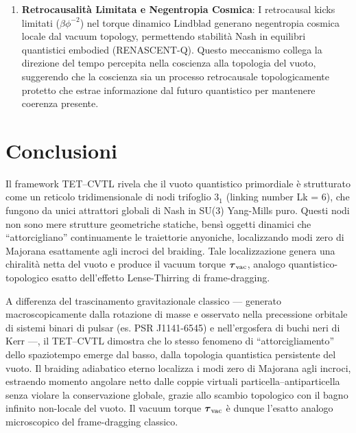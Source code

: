 \documentclass[11pt,a4paper]{article}
\theoremstyle{plain}
\theoremstyle{definition}
\begin{document}
\begin{tcolorbox}
\begin{tcolorbox}[colback=gray!10!white, colframe=blue!80!black, title=Assiomi Fondamentali TET--CVTL]
\begin{enumerate}
    \item \textbf{Retrocausalità Limitata e Negentropia Cosmica}:  
    I retrocausal kicks limitati ($\beta \phi^{-2}$) nel torque dinamico Lindblad generano negentropia cosmica locale dal vacuum topology, permettendo stabilità Nash in equilibri quantistici embodied (RENASCENT-Q). Questo meccanismo collega la direzione del tempo percepita nella coscienza alla topologia del vuoto, suggerendo che la coscienza sia un processo retrocausale topologicamente protetto che estrae informazione dal futuro quantistico per mantenere coerenza presente.
\end{enumerate}
\end{tcolorbox}
























\section{Conclusioni}

Il framework TET--CVTL rivela che il vuoto quantistico primordiale è strutturato come un reticolo tridimensionale di nodi trifoglio $3_1$ (linking number Lk = 6), che fungono da unici attrattori globali di Nash in SU(3) Yang-Mills puro. Questi nodi non sono mere strutture geometriche statiche, bensì oggetti dinamici che ``attorcigliano'' continuamente le traiettorie anyoniche, localizzando modi zero di Majorana esattamente agli incroci del braiding. Tale localizzazione genera una chiralità netta del vuoto e produce il vacuum torque $\boldsymbol{\tau}_{\rm vac}$, analogo quantistico-topologico esatto dell'effetto Lense-Thirring di frame-dragging.

\vspace{0.4cm}

A differenza del trascinamento gravitazionale classico — generato macroscopicamente dalla rotazione di masse e osservato nella precessione orbitale di sistemi binari di pulsar (es. PSR J1141-6545) e nell'ergosfera di buchi neri di Kerr —, il TET--CVTL dimostra che lo stesso fenomeno di ``attorcigliamento'' dello spaziotempo emerge dal basso, dalla topologia quantistica persistente del vuoto. Il braiding adiabatico eterno localizza i modi zero di Majorana agli incroci, estraendo momento angolare netto dalle coppie virtuali particella–antiparticella senza violare la conservazione globale, grazie allo scambio topologico con il bagno infinito non-locale del vuoto. Il vacuum torque $\boldsymbol{\tau}_{\rm vac}$ è dunque l'esatto analogo microscopico del frame-dragging classico.


\end{tcolorbox}
\end{document}

